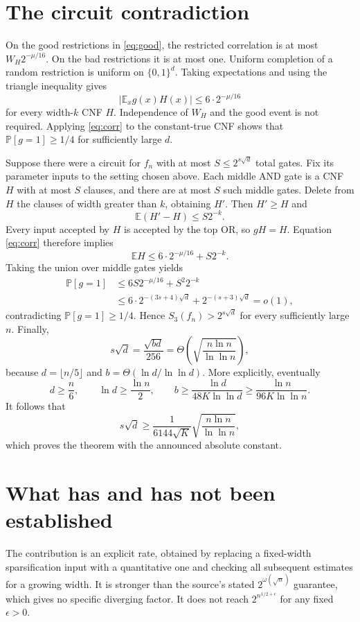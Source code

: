 \documentclass[11pt]{article}
\newcommand{\E}{\mathbb E}
\newcommand{\Prb}{\mathbb P}
\newcommand{\bits}{\{0,1\}}
\begin{document}
\section{The circuit contradiction}

On the good restrictions in \eqref{eq:good}, the restricted correlation
is at most $W_H2^{-\mu/16}$. On the bad restrictions it is at most one.
Uniform completion of a random restriction is uniform on $\bits^d$.
Taking expectations and using the triangle inequality gives
\begin{equation}\label{eq:corr}
 |\E_x g(x)H(x)|\le6\cdot2^{-\mu/16}
\end{equation}
for every width-$k$ CNF $H$. Independence of $W_H$ and the good event
is not required. Applying \eqref{eq:corr} to the constant-true CNF
shows that $\Prb[g=1]\ge1/4$ for sufficiently large $d$.

Suppose there were a circuit for $f_n$ with at most $S\le2^{s\sqrt d}$
total gates. Fix its parameter inputs to the setting chosen above.
Each middle AND gate is a CNF $H$ with at most $S$ clauses, and there
are at most $S$ such middle gates.
Delete from $H$ the clauses of width greater than $k$, obtaining $H'$.
Then $H'\ge H$ and
\[
 \E(H'-H)\le S2^{-k}.
\]
Every input accepted by $H$ is accepted by the top OR, so $gH=H$.
Equation \eqref{eq:corr} therefore implies
\[
 \E H\le6\cdot2^{-\mu/16}+S2^{-k}.
\]
Taking the union over middle gates yields
\begin{align*}
 \Prb[g=1]
 &\le6S2^{-\mu/16}+S^2 2^{-k}\\
 &\le6\cdot2^{-(3s+4)\sqrt d}
             +2^{-(s+3)\sqrt d}=o(1),
\end{align*}
contradicting $\Prb[g=1]\ge1/4$.
Hence $S_3(f_n)>2^{s\sqrt d}$ for every sufficiently large $n$.
Finally,
\[
s\sqrt d=\frac{\sqrt{bd}}{256}
       =\Theta\!\left(\sqrt{\frac{n\ln n}{\ln\ln n}}\right),
\]
because $d=\lfloor n/5\rfloor$ and
$b=\Theta(\ln d/\ln\ln d)$. More explicitly, eventually
\[
 d\ge\frac n6,\qquad \ln d\ge\frac{\ln n}{2},\qquad
 b\ge\frac{\ln d}{48K\ln\ln d}
   \ge\frac{\ln n}{96K\ln\ln n}.
\]
It follows that
\[
 s\sqrt d\ge\frac1{6144\sqrt K}
                 \sqrt{\frac{n\ln n}{\ln\ln n}},
\]
which proves the theorem with the announced absolute constant.

\section{What has and has not been established}

The contribution is an explicit rate, obtained by replacing a
fixed-width sparsification input with a quantitative one and checking
all subsequent estimates for a growing width. It is stronger than the
source's stated $2^{\omega(\sqrt n)}$ guarantee, which gives no specific
diverging factor. It does not reach $2^{n^{1/2+\epsilon}}$ for any fixed
$\epsilon>0$.
\end{document}
